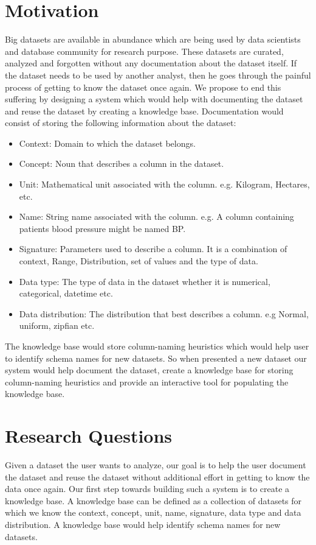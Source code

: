 \documentclass{vldb}
\begin{document}
\section{Motivation}
Big datasets are available in abundance which are being used by data scientists and database community for research purpose. These datasets are curated, analyzed and forgotten without any documentation about the dataset itself. If the dataset needs to be used by another analyst, then he goes through the painful process of getting to know the dataset once again. We propose to end this suffering by designing a system which would help with documenting the dataset and reuse the dataset by creating a knowledge base. Documentation would consist of storing the following information about the dataset:
\begin{itemize}
	\item Context: Domain to which the dataset belongs.
	\item Concept: Noun that describes a column in the dataset.
	\item Unit: Mathematical unit associated with the column. e.g. Kilogram, Hectares, etc.
	\item Name: String name associated with the column. e.g. A column containing patients blood pressure might be named BP.
	\item Signature: Parameters used to describe a column. It is a combination of context, Range, Distribution, set of values and the type of data.
	\item Data type: The type of data in the dataset whether it is numerical, categorical, datetime etc.
	\item Data distribution: The distribution that best describes a column. e.g Normal, uniform, zipfian etc.
\end{itemize}

The knowledge base would store column-naming heuristics which would help user to identify schema names for new datasets. So when presented a new dataset our system would help document the dataset, create a knowledge base for storing column-naming heuristics and provide an interactive tool for populating the knowledge base.


\section{Research Questions}
Given a dataset the user wants to analyze, our goal is to help the user document the dataset and reuse the dataset without additional effort in getting to know the data once again. Our first step towards building such a system is to create a knowledge base. A knowledge base can be defined as a collection of datasets for which we know the context, concept, unit, name, signature, data type and data distribution. A knowledge base would help identify schema names for new datasets.
\end{document}
